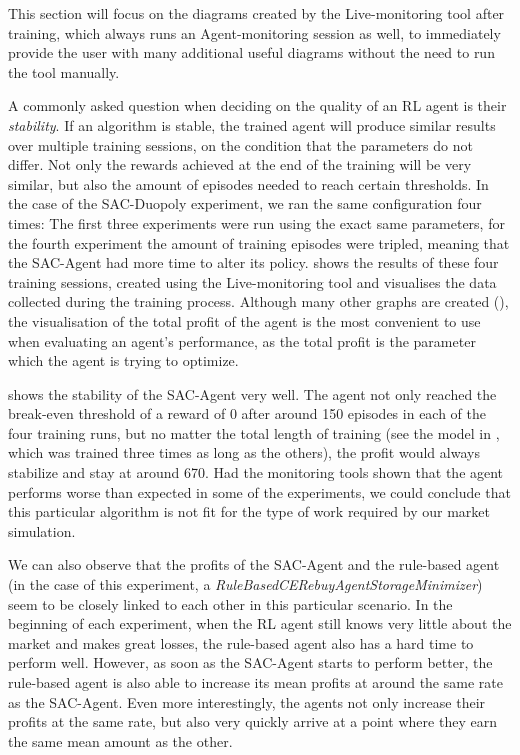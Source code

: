 This section will focus on the diagrams created by the Live-monitoring tool after training, which always runs an Agent-monitoring session as well, to immediately provide the user with many additional useful diagrams without the need to run the tool manually.

A commonly asked question when deciding on the quality of an RL agent is their \emph{stability}. If an algorithm is stable, the trained agent will produce similar results over multiple training sessions, on the condition that the parameters do not differ. Not only the rewards achieved at the end of the training will be very similar, but also the amount of episodes needed to reach certain thresholds. In the case of the SAC-Duopoly experiment, we ran the same configuration four times: The first three experiments were run using the exact same parameters, for the fourth experiment the amount of training episodes were tripled, meaning that the SAC-Agent had more time to alter its policy.  shows the results of these four training sessions, created using the Live-monitoring tool and visualises the data collected during the training process. Although many other graphs are created (), the visualisation of the total profit of the agent is the most convenient to use when evaluating an agent's performance, as the total profit is the parameter which the agent is trying to optimize.

 shows the stability of the SAC-Agent very well. The agent not only reached the break-even threshold of a reward of 0 after around 150 episodes in each of the four training runs, but no matter the total length of training (see the model in , which was trained three times as long as the others), the profit would always stabilize and stay at around 670. Had the monitoring tools shown that the agent performs worse than expected in some of the experiments, we could conclude that this particular algorithm is not fit for the type of work required by our market simulation.

We can also observe that the profits of the SAC-Agent and the rule-based agent (in the case of this experiment, a \emph{RuleBasedCERebuyAgentStorageMinimizer}) seem to be closely linked to each other in this particular scenario. In the beginning of each experiment, when the RL agent still knows very little about the market and makes great losses, the rule-based agent also has a hard time to perform well. However, as soon as the SAC-Agent starts to perform better, the rule-based agent is also able to increase its mean profits at around the same rate as the SAC-Agent. Even more interestingly, the agents not only increase their profits at the same rate, but also very quickly arrive at a point where they earn the same mean amount as the other.

